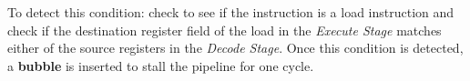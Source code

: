 \documentclass[12pt]{article}
\newenvironment{QandA}{\begin{enumerate}[label=\bfseries\arabic*.]\bfseries}
                      {\end{enumerate}}
\newenvironment{answered}{\par\quad\normalfont}{}
\begin{document}
\begin{QandA}
\begin{answered}
   To detect this condition: check to see if the instruction is a load instruction and check if the destination register field of the load in the \textit{Execute Stage} matches either of the source registers in the \textit{Decode Stage}. Once this condition is detected, a \textbf{bubble} is inserted to stall the pipeline for one cycle. 
   \end{answered}
   
   
\end{QandA}
\end{document}
